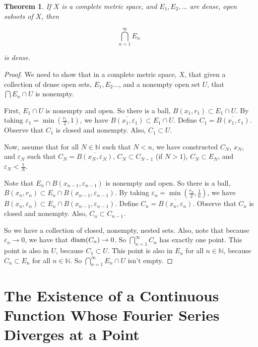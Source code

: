 \documentclass{amsart}
\newcommand{\vep}{\varepsilon}
\newcommand{\N}{\mathbb{N}}
\newcommand{\diam}{\text{\rm diam}}
\newtheorem{thm}{Theorem}[section]
\theoremstyle{definition}
\begin{document}
\begin{thm}If $X$ is a complete metric space, and $E_1, E_2, \ldots$ are dense, open subsets of $X$, then

\begin{displaymath}
\bigcap\limits_{n = 1}^{\infty} E_n
\end{displaymath}

is dense.
\end{thm}

\begin{proof}
We need to show that in a complete metric space, $X$, that given a collection of dense open sets, $E_1, E_2 \ldots$, and a nonempty open set $U$, that $\bigcap E_n \cap U$ is nonempty.

First, $E_1 \cap U$ is nonempty and open.
So there is a ball, $B(x_1,r_1) \subset E_1 \cap U$.
By taking $\vep_1 = \min(\frac{r_1}{2},1)$, we have $\overline{B(x_1,\vep_1)} \subset E_1 \cap U$.
Define $C_1 = \overline{B(x_1,\vep_1)}$.
Observe that $C_1$ is closed and nonempty. Also, $C_1 \subset U$.

Now, assume that for all $N \in \N$ such that $N < n$, we have constructed $C_{N}$, $x_{N}$, and $\vep_{N}$ such that $C_{N} = \overline{B(x_{N},\vep_{N})}$, $C_{N} \subset C_{N-1}$ (if $N >1$), $C_{N} \subset E_{N}$, and $\vep_{N} < \frac{1}{N}$.

Note that $E_n \cap B(x_{n-1},\vep_{n-1})$ is nonempty and open.
So there is a ball, $B(x_n,r_n) \subset E_n \cap B(x_{n-1},\vep_{n-1})$.
By taking $\vep_n = \min(\frac{r_n}{2},\frac{1}{n})$, we have $\overline{B(x_n,\vep_n)} \subset E_n \cap B(x_{n-1},\vep_{n-1})$.
Define $C_n = \overline{B(x_n,\vep_n)}$.
Observe that $C_n$ is closed and nonempty. Also, $C_n \subset C_{n-1}$.

So we have a collection of closed, nonempty, nested sets.
Also, note that because $\vep_n \to 0$, we have that $\diam(C_n) \to 0$. 
So $\bigcap\limits_{n=1}^\infty C_n$ has exactly one point.
This point is also in $U$, because $C_1 \subset U$.
This point is also in $E_n$ for all $n \in \N$, because $C_n \subset E_n$ for all $n \in \N$.
So $\bigcap\limits_{n=1}^\infty E_n \cap U$ isn't empty.

\end{proof}

\section{The Existence of a Continuous Function Whose Fourier Series Diverges at a Point}
\end{document}

